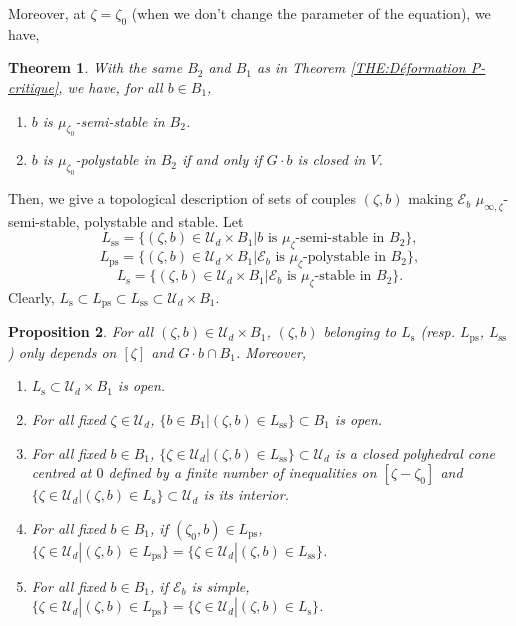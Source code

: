 \documentclass{article}
\newtheorem{theorem}{Theorem}[section]
\newtheorem{proposition}[theorem]{Proposition}
\theoremstyle{remark}
\theoremstyle{definition}
\newcommand{\E}{\mathcal{E}}
\newcommand{\mU}{\mathcal{U}}
\begin{document}
Moreover, at $\zeta = \zeta_0$ (when we don't change the parameter of the equation), we have,

\begin{theorem}\label{THE:Cas zeta = zeta_0}
    With the same $B_2$ and $B_1$ as in Theorem \ref{THE:Déformation P-critique}, we have, for all $b \in B_1$,
    \begin{enumerate}
        \item $b$ is $\mu_{\zeta_0}$-semi-stable in $B_2$.
        \item $b$ is $\mu_{\zeta_0}$-polystable in $B_2$ if and only if $G \cdot b$ is closed in $V$.
    \end{enumerate}
\end{theorem}

Then, we give a topological description of sets of couples $(\zeta,b)$ making $\E_b$ $\mu_{\infty,\zeta}$-semi-stable, polystable and stable. Let
$$
L_{\mathrm{ss}} = \{(\zeta,b) \in \mU_d \times B_1|b \textrm{ is $\mu_\zeta$-semi-stable in } B_2\},
$$
$$
L_{\mathrm{ps}} = \{(\zeta,b) \in \mU_d \times B_1|\E_b \textrm{ is $\mu_\zeta$-polystable in } B_2\},
$$
$$
L_{\mathrm{s}} = \{(\zeta,b) \in \mU_d \times B_1|\E_b \textrm{ is $\mu_\zeta$-stable in } B_2\}.
$$
Clearly, $L_{\mathrm{s}} \subset L_{\mathrm{ps}} \subset L_{\mathrm{ss}} \subset \mU_d \times B_1$.

\begin{proposition}\label{PRO:Topologies lieux stables}
    For all $(\zeta,b) \in \mU_d \times B_1$, $(\zeta,b)$ belonging to $L_{\mathrm{s}}$ (resp. $L_{\mathrm{ps}}$, $L_{\mathrm{ss}}$) only depends on $[\zeta]$ and $G \cdot b \cap B_1$. Moreover,
    \begin{enumerate}
        \item $L_{\mathrm{s}} \subset \mU_d \times B_1$ is open.
        \item For all fixed $\zeta \in \mU_d$, $\{b \in B_1|(\zeta,b) \in L_{\mathrm{ss}}\} \subset B_1$ is open.
        \item For all fixed $b \in B_1$, $\{\zeta \in \mU_d|(\zeta,b) \in L_{\mathrm{ss}}\} \subset \mU_d$ is a closed polyhedral cone centred at $0$ defined by a finite number of inequalities on $[\zeta - \zeta_0]$ and $\{\zeta \in \mU_d|(\zeta,b) \in L_{\mathrm{s}}\} \subset \mU_d$ is its interior.
        \item For all fixed $b \in B_1$, if $(\zeta_0,b) \in L_{\mathrm{ps}}$, $\{\zeta \in \mU_d|(\zeta,b) \in L_{\mathrm{ps}}\} = \{\zeta \in \mU_d|(\zeta,b) \in L_{\mathrm{ss}}\}$.
        \item For all fixed $b \in B_1$, if $\E_b$ is simple, $\{\zeta \in \mU_d|(\zeta,b) \in L_{\mathrm{ps}}\} = \{\zeta \in \mU_d|(\zeta,b) \in L_{\mathrm{s}}\}$.
    \end{enumerate}
\end{proposition}
\end{document}
